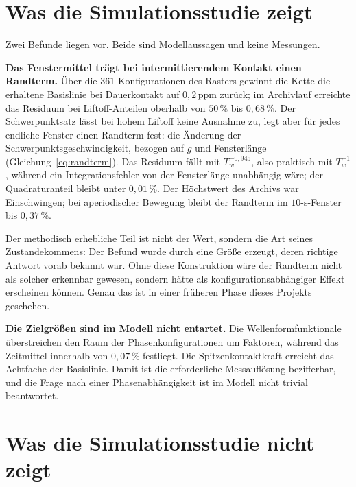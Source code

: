 \documentclass[12pt,a4paper]{report}
\begin{document}
\section{Was die Simulationsstudie zeigt}
\label{sec:sim-zeigt}

Zwei Befunde liegen vor. Beide sind Modellaussagen und keine Messungen.

\vspace{0.5em}

\textbf{Das Fenstermittel trägt bei intermittierendem Kontakt einen
Randterm.} Über die $361$ Konfigurationen des Rasters gewinnt die Kette
die erhaltene Basislinie bei Dauerkontakt auf $0{,}2\,\mathrm{ppm}$
zurück; im Archivlauf erreichte das Residuum bei Liftoff-Anteilen
oberhalb von $50\,\%$ bis $0{,}68\,\%$. Der Schwerpunktsatz lässt bei
hohem Liftoff keine Ausnahme zu, legt aber für jedes endliche Fenster
einen Randterm fest: die Änderung der Schwerpunktsgeschwindigkeit,
bezogen auf $g$ und Fensterlänge (Gleichung~\eqref{eq:randterm}). Das
Residuum fällt mit $T_w^{-0{,}945}$, also praktisch mit $T_w^{-1}$,
während ein Integrationsfehler von der Fensterlänge unabhängig wäre; der
Quadraturanteil bleibt unter $0{,}01\,\%$. Der Höchstwert des Archivs war
Einschwingen; bei aperiodischer Bewegung bleibt der Randterm im
$10$-s-Fenster bis $0{,}37\,\%$.

Der methodisch erhebliche Teil ist nicht der Wert, sondern die Art seines
Zustandekommens: Der Befund wurde durch eine Größe erzeugt, deren
richtige Antwort vorab bekannt war. Ohne diese Konstruktion wäre der
Randterm nicht als solcher erkennbar gewesen, sondern hätte
als konfigurationsabhängiger Effekt erscheinen können. Genau das ist in
einer früheren Phase dieses Projekts geschehen.

\vspace{0.5em}

\textbf{Die Zielgrößen sind im Modell nicht entartet.} Die
Wellenformfunktionale überstreichen den Raum der Phasenkonfigurationen um
Faktoren, während das Zeitmittel innerhalb von $0{,}07\,\%$ festliegt.
Die Spitzenkontaktkraft erreicht das Achtfache der Basislinie. Damit ist
die erforderliche Messauflösung bezifferbar, und die Frage nach einer
Phasenabhängigkeit ist im Modell nicht trivial beantwortet.

\section{Was die Simulationsstudie nicht zeigt}
\end{document}

